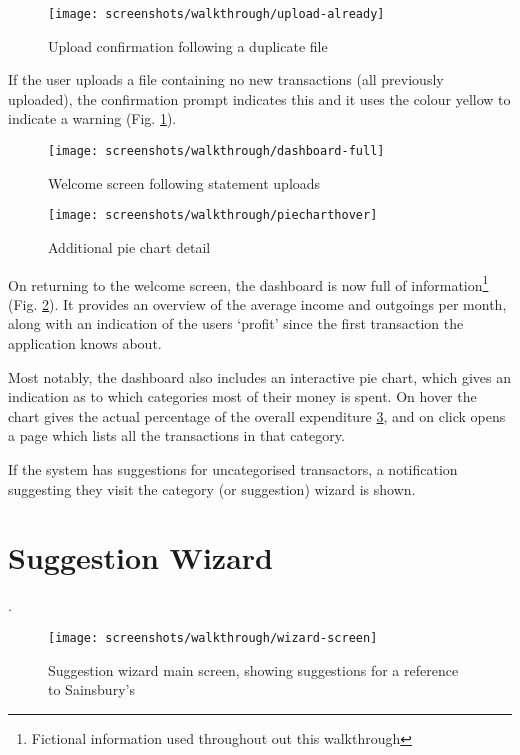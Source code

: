 \begin{figure}
\centering
\texttt{[image: screenshots/walkthrough/upload-already]}
\caption{Upload confirmation following a duplicate file}
\label{fig:upload-duplicate}
\end{figure}

If the user uploads a file containing no new transactions (all previously uploaded), the confirmation prompt indicates this and it uses the colour yellow to indicate a warning (Fig. \ref{fig:upload-duplicate}).

\begin{figure}
\centering
\texttt{[image: screenshots/walkthrough/dashboard-full]}
\caption{Welcome screen following statement uploads}
\label{fig:welcome-full}
\end{figure}

\begin{figure}
\centering
\texttt{[image: screenshots/walkthrough/piecharthover]}
\caption{Additional pie chart detail}
\label{fig:piecharthover}
\end{figure}

On returning to the welcome screen, the dashboard is now full of information\footnote{Fictional information used throughout out this walkthrough} (Fig. \ref{fig:welcome-full}). It provides an overview of the average income and outgoings per month, along with an indication of the users `profit' since the first transaction the application knows about. 

Most notably, the dashboard also includes an interactive pie chart, which gives an indication as to which categories most of their money is spent. On hover the chart gives the actual percentage of the overall expenditure \ref{fig:piecharthover}, and on click opens a page which lists all the transactions in that category.

If the system has suggestions for uncategorised transactors, a notification suggesting they visit the category (or suggestion) wizard is shown.

\section{Suggestion Wizard}
\label{subsection:suggestion-wizard-walkthrough}.

\begin{figure}
\centering
\texttt{[image: screenshots/walkthrough/wizard-screen]}
\caption{Suggestion wizard main screen, showing suggestions for a reference to Sainsbury's}
\label{fig:wizard-screen}
\end{figure}

